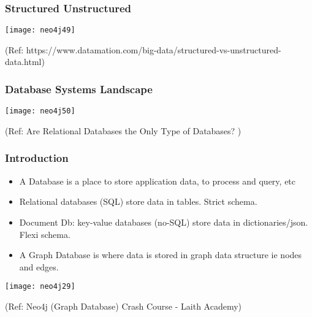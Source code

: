 \begin{frame}\frametitle{Structured Unstructured}


\begin{center}
\texttt{[image: neo4j49]}
\end{center}	

{\tiny (Ref: https://www.datamation.com/big-data/structured-vs-unstructured-data.html)}
\end{frame}



\begin{frame}\frametitle{Database Systems Landscape }


\begin{center}
\texttt{[image: neo4j50]}
\end{center}	

{\tiny (Ref: Are Relational Databases the Only Type of Databases? )}

\end{frame}



\begin{frame}\frametitle{Introduction}

\begin{itemize}
\item A Database is a place to store application data, to process and query, etc
\item Relational databases (SQL) store data in tables. Strict schema.
\item Document Db: key-value databases (no-SQL) store data in dictionaries/json. Flexi schema.
\item A Graph Database is where data is stored in graph data structure ie nodes and edges.
\end{itemize}

\begin{center}
\texttt{[image: neo4j29]}
\end{center}	

{\tiny (Ref: Neo4j (Graph Database) Crash Course - Laith Academy)}
\end{frame}


